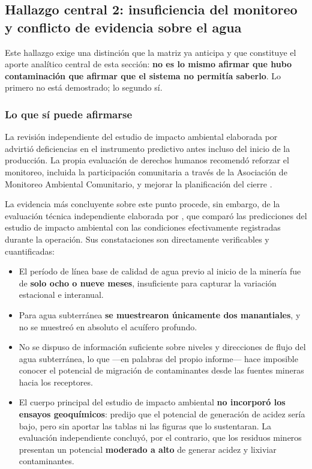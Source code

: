 \subsection{Hallazgo central 2: insuficiencia del monitoreo y conflicto de evidencia sobre el agua}

Este hallazgo exige una distinción que la matriz ya anticipa y que constituye el
aporte analítico central de esta sección: \textbf{no es lo mismo afirmar que hubo
contaminación que afirmar que el sistema no permitía saberlo}. Lo primero no está
demostrado; lo segundo sí.

\subsubsection{Lo que sí puede afirmarse}

La revisión independiente del estudio de impacto ambiental elaborada por
\textcite{moran2004review} advirtió deficiencias en el instrumento predictivo
antes incluso del inicio de la producción. La propia evaluación de derechos
humanos recomendó reforzar el monitoreo, incluida la participación comunitaria a
través de la Asociación de Monitoreo Ambiental Comunitario, y mejorar la
planificación del cierre \parencite{oncommonground2010hria}.

La evidencia más concluyente sobre este punto procede, sin embargo, de la
evaluación técnica independiente elaborada por \textcite{etech2010water}, que
comparó las predicciones del estudio de impacto ambiental con las condiciones
efectivamente registradas durante la operación. Sus constataciones son
directamente verificables y cuantificadas:

\begin{itemize}
  \item El período de línea base de calidad de agua previo al inicio de la
        minería fue de \textbf{solo ocho o nueve meses}, insuficiente para
        capturar la variación estacional e interanual.
  \item Para agua subterránea \textbf{se muestrearon únicamente dos
        manantiales}, y no se muestreó en absoluto el acuífero profundo.
  \item No se dispuso de información suficiente sobre niveles y direcciones de
        flujo del agua subterránea, lo que —en palabras del propio informe—
        hace imposible conocer el potencial de migración de contaminantes
        desde las fuentes mineras hacia los receptores.
  \item El cuerpo principal del estudio de impacto ambiental \textbf{no
        incorporó los ensayos geoquímicos}: predijo que el potencial de
        generación de acidez sería bajo, pero sin aportar las tablas ni las
        figuras que lo sustentaran. La evaluación independiente concluyó, por
        el contrario, que los residuos mineros presentan un potencial
        \textbf{moderado a alto} de generar acidez y lixiviar contaminantes.
\end{itemize}

